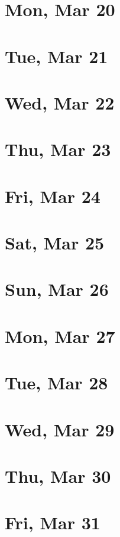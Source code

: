 	\section{Mon, Mar 20}
		
		
	\section{Tue, Mar 21}
		
		
	\section{Wed, Mar 22}
		
		
	\section{Thu, Mar 23}
		
		
	\section{Fri, Mar 24}
		
		
	\section{Sat, Mar 25}
		
		
	\section{Sun, Mar 26}
		
		
	\section{Mon, Mar 27}
		
		
	\section{Tue, Mar 28}
		
		
	\section{Wed, Mar 29}
		
		
	\section{Thu, Mar 30}
		
		
	\section{Fri, Mar 31}
		
		
